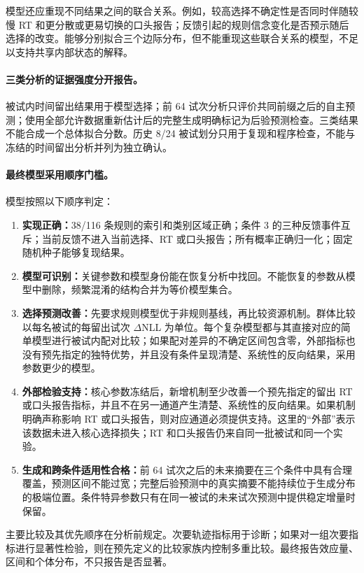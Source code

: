 模型还应重现不同结果之间的联合关系。例如，较高选择不确定性是否同时伴随较慢 RT 和更分散或更易切换的口头报告；反馈引起的规则信念变化是否预示随后选择的改变。能够分别拟合三个边际分布，但不能重现这些联合关系的模型，不足以支持共享内部状态的解释。

\paragraph{三类分析的证据强度分开报告。}
被试内时间留出结果用于模型选择；前 64 试次分析只评价共同前缀之后的自主预测；使用全部允许数据重新估计后的完整生成明确标记为后验预测检查。三类结果不能合成一个总体拟合分数。历史 8/24 被试划分只用于复现和程序检查，不能与冻结的时间留出分析并列为独立确认。

\paragraph{最终模型采用顺序门槛。}
模型按照以下顺序判定：
\begin{enumerate}
    \item \textbf{实现正确：}38/116 条规则的索引和类别区域正确；条件 3 的三种反馈事件互斥；当前反馈不进入当前选择、RT 或口头报告；所有概率正确归一化；固定随机种子能够复现结果。
    \item \textbf{模型可识别：}关键参数和模型身份能在恢复分析中找回。不能恢复的参数从模型中删除，频繁混淆的结构合并为等价模型集合。
    \item \textbf{选择预测改善：}先要求规则模型优于非规则基线，再比较资源机制。群体比较以每名被试的每留出试次 $\Delta$NLL 为单位。每个复杂模型都与其直接对应的简单模型进行被试内配对比较；如果配对差异的不确定区间包含零，外部指标也没有预先指定的独特优势，并且没有条件呈现清楚、系统性的反向结果，采用参数更少的模型。
    \item \textbf{外部检验支持：}核心参数冻结后，新增机制至少改善一个预先指定的留出 RT 或口头报告指标，并且不在另一通道产生清楚、系统性的反向结果。如果机制明确声称影响 RT 或口头报告，则对应通道必须提供支持。这里的“外部”表示该数据未进入核心选择损失；RT 和口头报告仍来自同一批被试和同一个实验。
    \item \textbf{生成和跨条件适用性合格：}前 64 试次之后的未来摘要在三个条件中具有合理覆盖，预测区间不能过宽；完整后验预测中的真实摘要不能持续位于生成分布的极端位置。条件特异参数只有在同一被试的未来试次预测中提供稳定增量时保留。
\end{enumerate}
主要比较及其优先顺序在分析前规定。次要轨迹指标用于诊断；如果对一组次要指标进行显著性检验，则在预先定义的比较家族内控制多重比较。最终报告效应量、区间和个体分布，不只报告是否显著。

